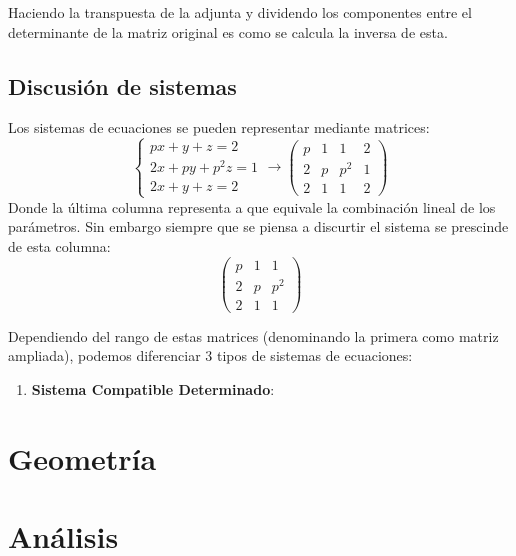 \documentclass[arial,a4paper,print]{article}
\begin{document}
Haciendo la transpuesta de la adjunta y dividendo los componentes entre el determinante de la matriz original es como se calcula la inversa de esta. 

\subsection{Discusión de sistemas}

Los sistemas de ecuaciones se pueden representar mediante matrices: 
\begin{equation*}
	\begin{cases}
		px + y + z = 2\\
		2x + py + p^{2}z = 1\\
		2x + y + z = 2
	\end{cases} \rightarrow \left(\begin{array}{lll|l}
	p & 1 & 1 & 2 \\
	2 & p & p^{2} & 1 \\
	2 & 1 & 1 & 2
\end{array}\right)
\end{equation*}
Donde la última columna representa a que equivale la combinación lineal de los parámetros. Sin embargo siempre que se piensa a discurtir el sistema se prescinde de esta columna:
\begin{equation*}
	\left(\begin{array}{lll}
		p & 1 & 1 \\
		2 & p & p^{2} \\
		2 & 1 & 1 
	\end{array}\right)
\end{equation*}

Dependiendo del rango de estas matrices (denominando la primera como matriz ampliada), podemos diferenciar $3$ tipos de sistemas de ecuaciones:
\begin{enumerate}
	\item \textbf{Sistema Compatible Determinado}:\\
	
\end{enumerate}

\section{Geometría}
\section{Análisis}
\end{document}
